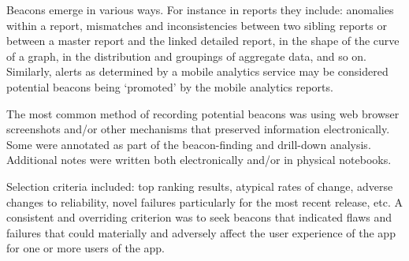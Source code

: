
Beacons emerge in various ways. For instance in reports they include: anomalies within a report, mismatches and inconsistencies between two sibling reports or between a master report and the linked detailed report, in the shape of the curve of a graph, in the distribution and groupings of aggregate data, and so on. Similarly, alerts as determined by a mobile analytics service may be considered potential beacons being `promoted' by the mobile analytics reports. 

The most common method of recording potential beacons was using web browser screenshots and/or other mechanisms that preserved information electronically. Some were annotated as part of the beacon-finding and drill-down analysis. Additional notes were written both electronically and/or in physical notebooks. 

Selection criteria included: top ranking results, atypical rates of change, adverse changes to reliability, novel failures particularly for the most recent release, etc. A consistent and overriding criterion was to seek beacons that indicated flaws and failures that could materially and adversely affect the user experience of the app for one or more users of the app.


 


